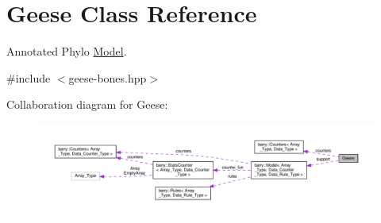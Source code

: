 \hypertarget{class_geese}{}\section{Geese Class Reference}
\label{class_geese}


Annotated Phylo \hyperlink{class_model}{Model}.  




{\ttfamily \#include $<$geese-\/bones.\+hpp$>$}



Collaboration diagram for Geese\+:
\nopagebreak
\begin{figure}[H]
\begin{center}
\leavevmode
\includegraphics[width=350pt]{class_geese__coll__graph}
\end{center}
\end{figure}
